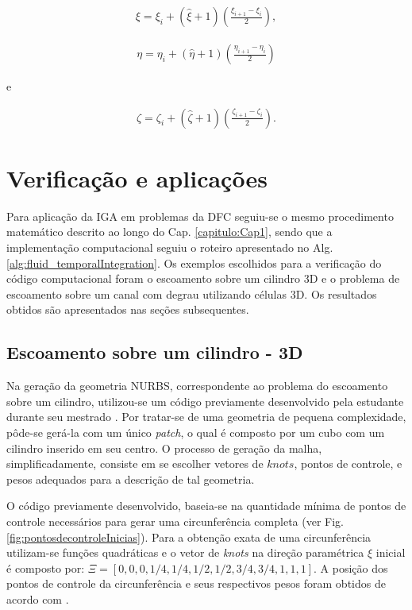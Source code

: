 \documentclass[tese_patricia]{subfiles}
\begin{document}
\begin{align}
\xi = \xi_{i} + \left(\hat{\xi}+1\right) \left(\frac{\xi_{i+1}-\xi_{i}}{2}\right),
\end{align}

\begin{align}
\eta = \eta_{i} + \left(\hat{\eta}+1\right) \left(\frac{\eta_{i+1}-\eta_{i}}{2}\right)
\end{align}

\noindent e

\begin{align}
\zeta = \zeta_{i} + \left(\hat{\zeta}+1\right) \left(\frac{\zeta_{i+1}-\zeta_{i}}{2}\right).
\end{align}


\section{Verificação e aplicações}

Para aplicação da IGA em problemas da DFC seguiu-se o mesmo procedimento matemático descrito ao longo do Cap. \ref{capitulo:Cap1}, sendo que a implementação computacional seguiu o roteiro apresentado no Alg. \ref{alg:fluid_temporalIntegration}. Os exemplos escolhidos para a verificação do código computacional foram o escoamento sobre um cilindro 3D e o problema de escoamento sobre um canal com degrau utilizando células 3D. Os resultados obtidos são apresentados nas seções subsequentes.

\subsection {Escoamento sobre um cilindro - 3D}

Na geração da geometria NURBS, correspondente ao problema do escoamento sobre um cilindro, utilizou-se um código previamente desenvolvido pela estudante durante seu mestrado \cite{Tonon:2016}. Por tratar-se de uma geometria de pequena complexidade, pôde-se gerá-la com um único \textit{patch}, o qual é composto por um cubo com um cilindro inserido em seu centro.
O processo de geração da malha, simplificadamente, consiste em se escolher vetores de $knots$, pontos de controle, e pesos adequados para a descrição de tal geometria.

O código previamente desenvolvido, baseia-se na quantidade mínima de pontos de controle necessários para gerar uma circunferência completa (ver Fig. \ref{fig:pontosdecontroleInicias}). Para a obtenção exata de uma circunferência utilizam-se funções quadráticas e o vetor de \textit {knots} na direção paramétrica $\xi$ inicial é composto por: $\Xi=\left[0,0,0,1/4,1/4,1/2,1/2,3/4,3/4,1,1,1\right]$. A posição dos pontos de controle da circunferência e seus respectivos pesos foram obtidos de acordo com . 
\end{document}
